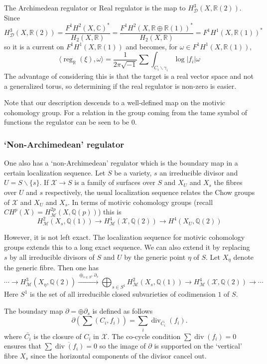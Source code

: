 \documentclass[11pt,a4paper]{article}
\newcommand {\XX}{{\mathcal X}}
\newcommand {\C}{{\mathds C}}
\newcommand {\Q}{{\mathds Q}}
\newcommand {\R}{{\mathds R}}
\newcommand {\M}{{\mathcal M}}
\newcommand {\D}{{\mathcal D}}
\def\div{\operatorname{div}}
\def\reg{\operatorname{reg}}
\begin{document}
The Archimedean regulator  or Real regulator is the map to $H^3_{\D}(X,\R(2))$. Since 
%
$$H^3_{\D}(X,\R(2))=\frac{F^1H^2(X,\C)^*}{H_2(X,\R)}=\frac{F^1H^2(X,\R \oplus \R(1))^*}{H_2(X,\R)}=F^1H^1(X,\R(1))^*$$
% 
so it is a current on $F^1H^1(X,\R(1))$ and becomes, for $\omega \in F^1H^1(X,\R(1))$, 
%
$$\langle \reg_{\R}(\xi),\omega \rangle=\frac{1}{2\pi \sqrt {-1}}\sum \int_{C_i \backslash \gamma_i} \log|f_i|\omega$$
%
The advantage of considering this is that the target is a real vector space and not a generalized torus, so determining if the real regulator is non-zero is easier. 

Note that our description descends to a well-defined map on the motivic cohomology group. For a relation in the group coming from the tame symbol of functions the regulator can be seen to be $0$. 

\subsubsection {`Non-Archimedean' regulator}

\label{nonarchregulator}

One also has a `non-Archimedean' regulator which is the boundary map in a certain localization sequence. Let $S$ be a variety, $s$ an irreducible divisor and $U=S \backslash \{s\}$. If $\XX \rightarrow S$ is a family of surfaces over $S$ and $X_U$ and $X_s$ the fibres over $U$ and $s$ respectively, the usual localization sequence relates the Chow groups of $\XX$ and $X_U$ and $X_s$. In terms of motivic cohomology groups (recall $CH^p(X)=H^{2p}_{\M}(X,\Q(p))$) this is 
%
$$H^2_{\M}(X_s,\Q(1)) \rightarrow H^{4}_{\M}(\XX,\Q(2)) \rightarrow H^{4}(X_U,\Q(2))$$
%

However, it is not left exact. The localization sequence for motivic cohomology groups \cite{bloc} extends this to a long exact sequence. We can also extend it by replacing $s$ by all irreducible divisors of $S$  and $U$ by the generic point $\eta$  of $S$. Let $X_{\eta}$ denote the generic fibre. Then one has 
%
$$\cdots \longrightarrow  H^3_{\M}(X_{\eta},\Q(2)) \stackrel{\oplus_{s \in S^1} \partial_s}{\longrightarrow} \bigoplus_{s \in S^1}  H^2_{\M}(X_s,\Q(1)) \longrightarrow H^4_{\M}(\XX,\Q(2)) \longrightarrow \cdots $$
%
Here $S^1$ is the set of all irreducible closed subvarieties of codimension $1$  of $S$. 

The boundary map $\partial=\oplus \partial_s$ is defined as follows
%
$$\partial \left(\sum (C_i,f_i)\right)= \sum_i \div_{\bar{C_i}}(f_i).$$
%
where $\bar{C_i}$ is the closure of $C_i$ in  $\XX$. The co-cycle condition $\sum \div(f_i)=0$ ensures that $\sum \overline{\div(f_i)}=0$ so the image of $\partial$ is supported on the `vertical' fibre $X_s$ since the horizontal components of the divisor cancel out.
\end{document}
